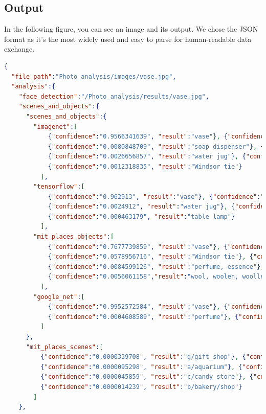 \documentclass{article}
\begin{document}
    \subsection{Output}
        In the following figure, you can see an image and its output. We chose the JSON format as it's the most widely used and easy to parse for human-readable data exchange. 
        \begin{lstlisting}[language=json,firstnumber=1]
{
  "file_path":"Photo_analysis/images/vase.jpg",
  "analysis":{
    "face_detection":"/Photo_analysis/results/vase.jpg",
    "scenes_and_objects":{
      "scenes_and_objects":{
        "imagenet":[ 
            {"confidence":"0.9566341639", "result":"vase"}, {"confidence":"0.0160881840", "result":"pitcher"},
            {"confidence":"0.0080848709", "result":"soap dispenser"}, {"confidence":"0.0075505734", "result":"perfume"},
            {"confidence":"0.0026656857", "result":"water jug"}, {"confidence":"0.0021058426", "result":"pop bottle"},
            {"confidence":"0.0012318835", "result":"Windsor tie"} 
          ],
        "tensorflow":[ 
            {"confidence":"0.962913", "result":"vase"}, {"confidence":"0.0103573", "result":"pitcher, ewer"},
            {"confidence":"0.0024912", "result":"water jug"}, {"confidence":"0.00140067", "result":"perfume, essence"},
            {"confidence":"0.000463179", "result":"table lamp"} 
          ],
        "mit_places_objects":[ 
            {"confidence":"0.7677739859", "result":"vase"}, {"confidence":"0.0802639052", "result":"pitcher, ewer"},
            {"confidence":"0.0578956716", "result":"Windsor tie"}, {"confidence":"0.0182715617", "result":"sock"},
            {"confidence":"0.0084599126", "result":"perfume, essence"}, {"confidence":"0.0064541521", "result":"coil, spiral, volute, whorl, helix"},
            {"confidence":"0.0056061158","result":"wool, woolen, woollen"} 
          ],
        "google_net":[ 
            {"confidence":"0.9952572584", "result":"vase"}, {"confidence":"0.0035603321", "result":"pitcher"},
            {"confidence":"0.0004608589", "result":"perfume"}, {"confidence":"0.0004501561", "result":"goblet"} 
          ]
      },
      "mit_places_scenes":[
          {"confidence":"0.0000339708", "result":"g/gift_shop"}, {"confidence":"0.0000232988", "result":"a/art_gallery"},
          {"confidence":"0.0000095298", "result":"a/aquarium"}, {"confidence":"0.0000079828", "result":"c/clothing_store"},
          {"confidence":"0.0000045859", "result":"c/candy_store"}, {"confidence":"0.0000036292", "result":"m/museum/indoor"},
          {"confidence":"0.0000014239", "result":"b/bakery/shop"}
        ]
    },\end{lstlisting}
\end{document}
